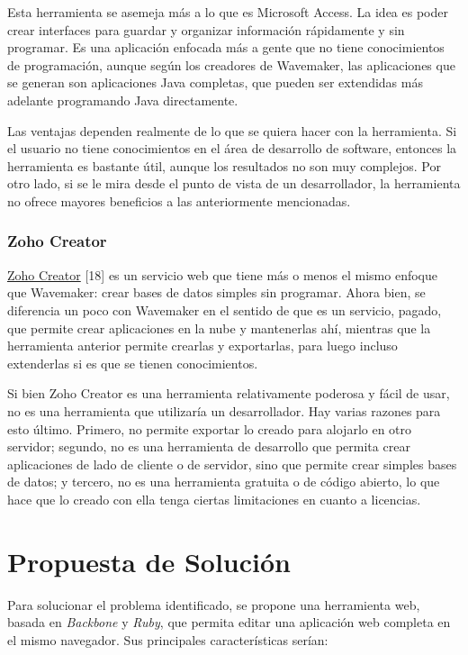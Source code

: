 \documentclass[12pt,titlepage,]{article}
\begin{document}
Esta herramienta se asemeja más a lo que es Microsoft Access. La idea es
poder crear interfaces para guardar y organizar información rápidamente
y sin programar. Es una aplicación enfocada más a gente que no tiene
conocimientos de programación, aunque según los creadores de Wavemaker,
las aplicaciones que se generan son aplicaciones Java completas, que
pueden ser extendidas más adelante programando Java directamente.

Las ventajas dependen realmente de lo que se quiera hacer con la
herramienta. Si el usuario no tiene conocimientos en el área de
desarrollo de software, entonces la herramienta es bastante útil, aunque
los resultados no son muy complejos. Por otro lado, si se le mira desde
el punto de vista de un desarrollador, la herramienta no ofrece mayores
beneficios a las anteriormente mencionadas.

\subsubsection{Zoho Creator}

\href{http://www.zoho.com/creator/}{Zoho Creator} {[}18{]} es un
servicio web que tiene más o menos el mismo enfoque que Wavemaker: crear
bases de datos simples sin programar. Ahora bien, se diferencia un poco
con Wavemaker en el sentido de que es un servicio, pagado, que permite
crear aplicaciones en la nube y mantenerlas ahí, mientras que la
herramienta anterior permite crearlas y exportarlas, para luego incluso
extenderlas si es que se tienen conocimientos.

Si bien Zoho Creator es una herramienta relativamente poderosa y fácil
de usar, no es una herramienta que utilizaría un desarrollador. Hay
varias razones para esto último. Primero, no permite exportar lo creado
para alojarlo en otro servidor; segundo, no es una herramienta de
desarrollo que permita crear aplicaciones de lado de cliente o de
servidor, sino que permite crear simples bases de datos; y tercero, no
es una herramienta gratuita o de código abierto, lo que hace que lo
creado con ella tenga ciertas limitaciones en cuanto a licencias.

\clearpage
\newpage

\section{Propuesta de Solución}

Para solucionar el problema identificado, se propone una herramienta
web, basada en \emph{Backbone} y \emph{Ruby}, que permita editar una
aplicación web completa en el mismo navegador. Sus principales
características serían:
\end{document}
